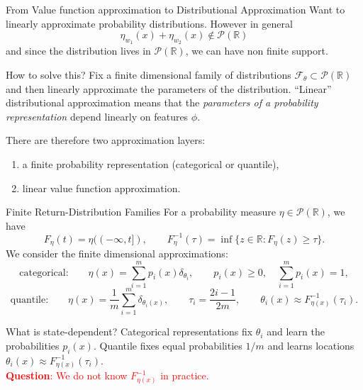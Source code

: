 \documentclass[10pt]{beamer}
\newcommand{\R}{\mathbb{R}}
\newcommand{\Pcal}{\mathcal{P}}
\newcommand{\F}{\mathcal{F}}
\newcommand{\1}{\mathds{1}}
\begin{document}
\begin{frame}{From Value function approximation to Distributional Approximation}
  Want to linearly approximate probability distributions. However in general 
  \[
   \eta_{w_1}(x)+\eta_{w_2}(x) \notin \Pcal(\R)
  \]
  and since the distribution lives in $\Pcal(\R)$, we can have non finite support. 
  \begin{block}{How to solve this?}
    Fix a finite dimensional family of distributions $\F_\theta\subset\Pcal(\R)$ and then linearly approximate the parameters of the distribution.
    ``Linear'' distributional approximation means that the \emph{parameters of
    a probability representation} depend linearly on features $\phi$.
  \end{block}
  There are therefore two approximation layers:
  \begin{enumerate}
    \item a finite probability representation (categorical or quantile),
    \item linear value function approximation.
  \end{enumerate}
\end{frame}

\begin{frame}{Finite Return-Distribution Families}
  For a probability measure $\eta\in\Pcal(\R)$, we have 
  \[
    F_\eta(t)=\eta((-\infty,t]),
    \qquad
    F_\eta^{-1}(\tau)=\inf\{z\in\R:F_\eta(z)\geq\tau\}.
  \]
  We consider the finite dimensional approximations:
  \[
    \text{categorical:}\qquad
    \eta(x)=\sum_{i=1}^m p_i(x)\delta_{\theta_i},
    \qquad
    p_i(x)\geq0,\quad \sum_{i=1}^m p_i(x)=1,
  \]
  \[
    \text{quantile:}\qquad
    \eta(x)=\frac1m\sum_{i=1}^m\delta_{\theta_i(x)},
    \qquad
    \tau_i=\frac{2i-1}{2m}, \qquad  \theta_i(x)\approx F_{\eta(x)}^{-1}(\tau_i).
  \]
  \begin{block}{What is state-dependent?}
    Categorical representations fix $\theta_i$ and learn the
    probabilities $p_i(x)$. Quantile fixes equal probabilities $1/m$ and learns
    locations $\theta_i(x)\approx F_{\eta(x)}^{-1}(\tau_i)$. \\

    \pause 
    \textcolor{red}{\textbf{Question}: We do not know $F^{-1}_{\eta(x)}$ in practice.}
  \end{block}
\end{frame}
\end{document}
